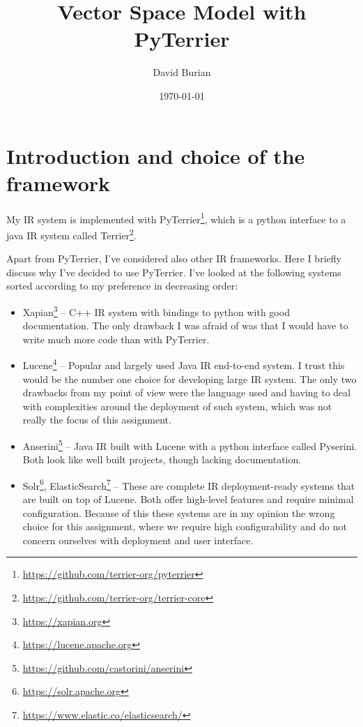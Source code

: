 \documentclass[10pt]{article}
\author{David Burian}
\date{\today}
\title{Vector Space Model with PyTerrier}
\begin{document}
\maketitle

\section{Introduction and choice of the framework}

My IR system is implemented with
PyTerrier\footnote{\url{https://github.com/terrier-org/pyterrier}}, which is a
python interface to a java IR system called
Terrier\footnote{\url{https://github.com/terrier-org/terrier-core}}.

Apart from PyTerrier, I've considered also other IR frameworks. Here I briefly
discuss why I've decided to use PyTerrier. I've looked at the following systems
sorted according to my preference in decreasing order:

\begin{itemize}
    \item Xapian\footnote{\url{https://xapian.org}} -- C++ IR system with
        bindings to python with good documentation. The only drawback I was
        afraid of was that I would have to write much more code than with PyTerrier.
    \item Lucene\footnote{\url{https://lucene.apache.org}} -- Popular and
        largely used Java IR end-to-end system. I trust this would be the number
        one choice for developing large IR system. The only two drawbacks from
        my point of view were the language used and having to deal with
        complexities around the deployment of such system, which was not really
        the focus of this assignment.
    \item Anserini\footnote{\url{https://github.com/castorini/anserini}} -- Java
        IR built with Lucene with a python interface called Pyserini. Both look
        like well built projects, though lacking documentation.
    \item Solr\footnote{\url{https://solr.apache.org}},
        ElasticSearch\footnote{\url{https://www.elastic.co/elasticsearch/}} --
        These are complete IR deployment-ready systems that are built on top of
        Lucene. Both offer high-level features and require minimal
        configuration. Because of this these systems are in my opinion the wrong
        choice for this assignment, where we require high configurability and do
        not concern ourselves with deployment and user interface.
\end{itemize}
\end{document}
